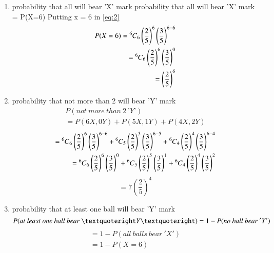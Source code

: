 \documentclass[journal,12pt,twocolumn]{IEEEtran}
\begin{document}
\begin{enumerate}
    \item probability that all will bear ’X’ mark
    probability that all will bear ’X’ mark = P(X=6)
    Putting x = 6 in \eqref{eq:2}
\begin{alignat*}{3}
    P(X=6) = \Mycomb[6]{6} \left(\frac{2}{5}\right)^6 \left(\frac{3}{5}\right)^{6-6}\\
    = \Mycomb[6]{6} \left(\frac{2}{5}\right)^6 \left(\frac{3}{5}\right)^{0}\\
    = \left(\frac{2}{5}\right)^6
\end{alignat*}
\item probability that not more than 2 will bear ’Y’ mark
\begin{equation*}
\begin{split}
    P(not~more~than~2~’Y’)\\
    = P(6X,0Y)+P(5X,1Y)+P(4X,2Y)
\end{split}
\end{equation*}
\begin{equation*}
\begin{split}
    = \Mycomb[6]{6} \left(\frac{2}{5}\right)^6 \left(\frac{3}{5}\right)^{6-6} + \Mycomb[6]{5} \left(\frac{2}{5}\right)^5 \left(\frac{3}{5}\right)^{6-5} + \Mycomb[6]{4} \left(\frac{2}{5}\right)^4 \left(\frac{3}{5}\right)^{6-4}\\
    = \Mycomb[6]{6} \left(\frac{2}{5}\right)^6 \left(\frac{3}{5}\right)^{0} + \Mycomb[6]{5} \left(\frac{2}{5}\right)^5 \left(\frac{3}{5}\right)^{1} + \Mycomb[6]{4} \left(\frac{2}{5}\right)^4 \left(\frac{3}{5}\right)^{2}
\end{split}
\end{equation*}
\begin{equation*}
     = 7 \left(\frac{2}{5}\right)^4
\end{equation*}
\item probability that at least one ball will bear ’Y’ mark
\begin{equation*}
     P(at~least~one~ball~bear~’Y’) = 1 - P(no~ball~bear~'Y')\\
\end{equation*}
\begin{equation*}
\begin{split}
     =  1 - P(all~balls~bear~'X')\\
     = 1 - P(X = 6)
\end{split}
\end{equation*}
\begin{equation*}
\begin{split}

\end{split}
\end{equation*}
\end{enumerate}
\end{document}
